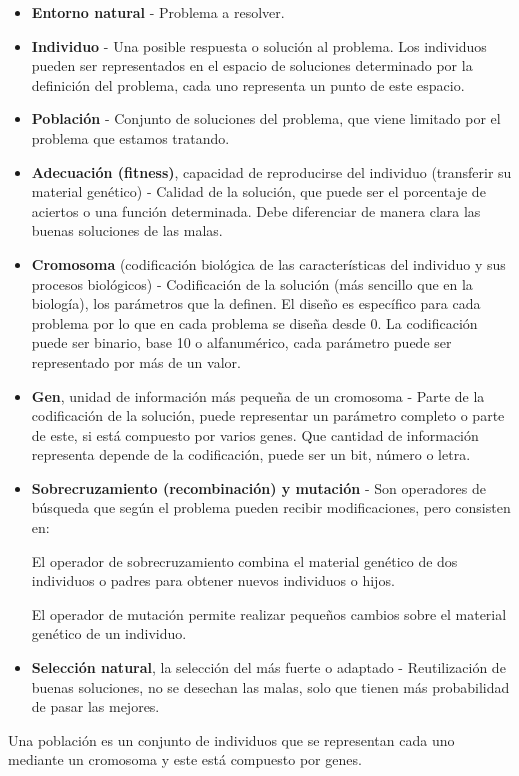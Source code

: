 \documentclass[12pt, twoside, openright]{report} %
\begin{document}
\begin{itemize}
	\item \textbf{Entorno natural} - Problema a resolver.
	\item \textbf{Individuo} - Una posible respuesta o solución al problema. Los individuos pueden ser representados en el espacio de soluciones determinado por la definición del problema, cada uno representa un punto de este espacio.
	\item \textbf{Población} - Conjunto de soluciones del problema, que viene limitado por el problema que estamos tratando.
	\item \textbf{Adecuación (fitness)}, capacidad de reproducirse del individuo (transferir su material genético) - Calidad de la solución, que puede ser el porcentaje de aciertos o una función determinada. Debe diferenciar de manera clara las buenas soluciones de las malas.
	\item \textbf{Cromosoma} (codificación biológica de las características del individuo y sus procesos biológicos) - Codificación de la solución (más sencillo que en la biología), los parámetros que la definen. El diseño es específico para cada problema por lo que en cada problema se diseña desde 0. La codificación puede ser binario, base 10 o alfanumérico, cada parámetro puede ser representado por más de un valor.
	\item \textbf{Gen}, unidad de información más pequeña de un cromosoma - Parte de la codificación de la solución, puede representar un parámetro completo o parte de este, si está compuesto por varios genes. Que cantidad de información representa depende de la codificación, puede ser un bit, número o letra.
	\item \textbf{Sobrecruzamiento (recombinación) y mutación} - Son operadores de búsqueda que según el problema pueden recibir modificaciones, pero consisten en:

	      El operador de sobrecruzamiento combina el material genético de dos individuos o padres para obtener nuevos individuos o hijos.

	      El operador de mutación permite realizar pequeños cambios sobre el material genético de un individuo.
	\item \textbf{Selección natural}, la selección del más fuerte o adaptado - Reutilización de buenas soluciones, no se desechan las malas, solo que tienen más probabilidad de pasar las mejores.
\end{itemize}

Una población es un conjunto de individuos que se representan cada uno mediante un cromosoma y este está compuesto por genes.
\end{document}
